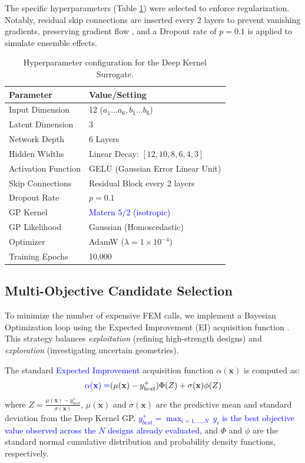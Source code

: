 \documentclass[
  preprint,
  12pt,
  a4paper
]{elsarticle}
\newcommand{\new}[1]{\textcolor{blue}{#1}}
\begin{document}
The specific hyperparameters (Table \ref{tab:hyperparameters}) were selected to enforce regularization. Notably, residual skip connections are inserted every 2 layers to prevent vanishing gradients, preserving gradient flow \cite{he2016deep}, and a Dropout rate of $p=0.1$ is applied to simulate ensemble effects.

\begin{table}[htbp]
    \centering
    \caption{Hyperparameter configuration for the Deep Kernel Surrogate.}
    \label{tab:hyperparameters}
    \begin{tabular}{l l}
        \toprule
        \textbf{Parameter} & \textbf{Value/Setting} \\
        \midrule
        Input Dimension & 12 ($a_1\dots a_6, b_1\dots b_6$) \\
        Latent Dimension & 3 \\
        Network Depth & 6 Layers \\
        Hidden Widths & Linear Decay: $[12, 10, 8, 6, 4, 3]$ \\
        Activation Function & GELU (Gaussian Error Linear Unit) \\
        Skip Connections & Residual Block every 2 layers \\
        Dropout Rate & $p=0.1$ \\
        \midrule
        GP Kernel & \new{Matern $5/2$ (isotropic)} \\
        GP Likelihood & Gaussian (Homoscedastic) \\
        Optimizer & AdamW ($\lambda=1\times 10^{-4}$) \\
        Training Epochs & 10,000 \\
        \bottomrule
    \end{tabular}
\end{table}

\subsection{Multi-Objective Candidate Selection}
To minimize the number of expensive FEM calls, we implement a Bayesian Optimization loop using the Expected Improvement (EI) acquisition function \cite{jones1998efficient}. This strategy balances \textit{exploitation} (refining high-strength designs) and \textit{exploration} (investigating uncertain geometries).

The standard \new{Expected Improvement} acquisition function $\alpha(\mathbf{x})$ is computed as:
\begin{equation}
    \new{\alpha(\mathbf{x}) =} (\mu(\mathbf{x}) - y_{best}^+) \Phi(Z) + \sigma(\mathbf{x}) \phi(Z)
\end{equation}
where $Z = \frac{\mu(\mathbf{x}) - y_{best}^+}{\sigma(\mathbf{x})}$, $\mu(\mathbf{x})$ and $\sigma(\mathbf{x})$ are the predictive mean and standard deviation from the Deep Kernel GP, \new{$y_{best}^+ = \max_{i=1,\dots,N}\, y_i$ is the best objective value observed across the $N$ designs already evaluated,} and $\Phi$ and $\phi$ are the standard normal cumulative distribution and probability density functions, respectively.
\end{document}
